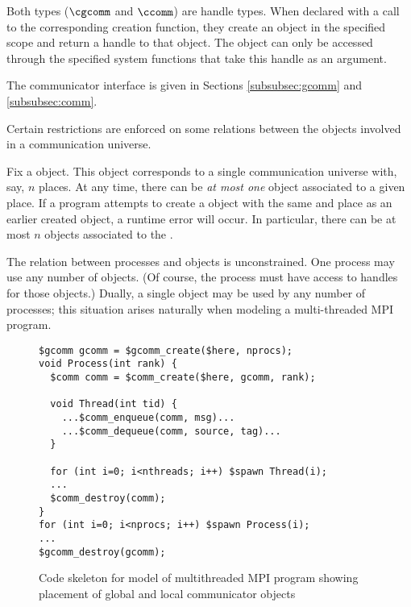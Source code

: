 Both types ($\cgcomm$ and $\ccomm$) are handle types. When declared
with a call to the corresponding creation function, they create an
object in the specified scope and return a handle to that object. The
object can only be accessed through the specified system functions
that take this handle as an argument.


The communicator interface is given in Sections \ref{subsubsec:gcomm} and  \ref{subsubsec:comm}.

Certain restrictions are enforced on some relations between the
objects involved in a communication universe.

Fix a \cgcomm{} object.  This object corresponds to a single
communication universe with, say, $n$ places.  At any time, there can
be \emph{at most one} \ccomm{} object associated to a given place.  If
a program attempts to create a \ccomm{} object with the same \cgcomm{}
and place as an earlier created \ccomm{} object, a runtime error will
occur.  In particular, there can be at most $n$ \ccomm{} objects
associated to the \cgcomm.

The relation between processes and \ccomm{} objects is unconstrained.
One process may use any number of \ccomm{} objects.  (Of course, the
process must have access to handles for those \ccomm{} objects.)
Dually, a single \ccomm{} object may be used by any number of
processes; this situation arises naturally when modeling a
multi-threaded MPI program.

\begin{figure}
  \begin{small}
\begin{verbatim}
$gcomm gcomm = $gcomm_create($here, nprocs);
void Process(int rank) {
  $comm comm = $comm_create($here, gcomm, rank);

  void Thread(int tid) {
    ...$comm_enqueue(comm, msg)...
    ...$comm_dequeue(comm, source, tag)...
  }

  for (int i=0; i<nthreads; i++) $spawn Thread(i);
  ...
  $comm_destroy(comm);
}
for (int i=0; i<nprocs; i++) $spawn Process(i);
...
$gcomm_destroy(gcomm);
\end{verbatim}
  \end{small}
  \caption{Code skeleton for model of multithreaded MPI program
    showing placement of global and local communicator objects}
  \label{fig:mpi-threads-comm}
\end{figure}

